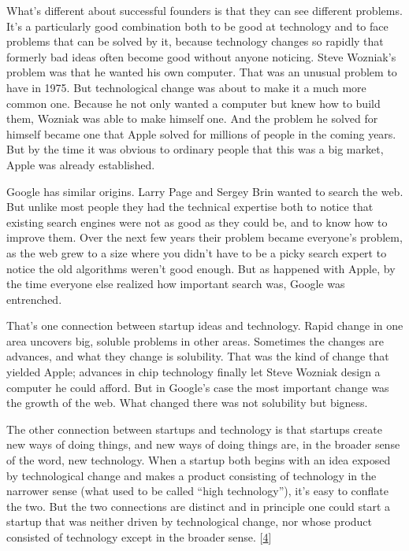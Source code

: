 What's different about successful founders is that they can see
different problems. It's a particularly good combination both to be good
at technology and to face problems that can be solved by it, because
technology changes so rapidly that formerly bad ideas often become good
without anyone noticing. Steve Wozniak's problem was that he wanted his
own computer. That was an unusual problem to have in 1975. But
technological change was about to make it a much more common one.
Because he not only wanted a computer but knew how to build them,
Wozniak was able to make himself one. And the problem he solved for
himself became one that Apple solved for millions of people in the
coming years. But by the time it was obvious to ordinary people that
this was a big market, Apple was already established.

Google has similar origins. Larry Page and Sergey Brin wanted to search
the web. But unlike most people they had the technical expertise both to
notice that existing search engines were not as good as they could be,
and to know how to improve them. Over the next few years their problem
became everyone's problem, as the web grew to a size where you didn't
have to be a picky search expert to notice the old algorithms weren't
good enough. But as happened with Apple, by the time everyone else
realized how important search was, Google was entrenched.

That's one connection between startup ideas and technology. Rapid change
in one area uncovers big, soluble problems in other areas. Sometimes the
changes are advances, and what they change is solubility. That was the
kind of change that yielded Apple; advances in chip technology finally
let Steve Wozniak design a computer he could afford. But in Google's
case the most important change was the growth of the web. What changed
there was not solubility but bigness.

The other connection between startups and technology is that startups
create new ways of doing things, and new ways of doing things are, in
the broader sense of the word, new technology. When a startup both
begins with an idea exposed by technological change and makes a product
consisting of technology in the narrower sense (what used to be called
``high technology''), it's easy to conflate the two. But the two
connections are distinct and in principle one could start a startup that
was neither driven by technological change, nor whose product consisted
of technology except in the broader sense. {[}\hyperref[f4n]{4}{]}

